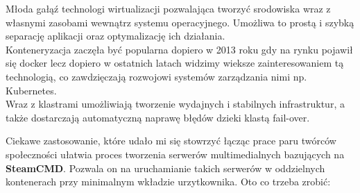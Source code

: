 \documentclass[10pt,a4paper]{report}
\begin{document}
Młoda gałąź technologi wirtualizacji pozwalająca tworzyć srodowiska wraz z własnymi zasobami wewnątrz systemu operacyjnego. Umożliwa to prostą i szybką separację aplikacji oraz optymalizację ich działania.\\

Konteneryzacja zaczęła być popularna dopiero w 2013 roku gdy na rynku pojawił się docker lecz dopiero w ostatnich latach widzimy wieksze zainteresowaniem tą technologią, co zawdzięczają rozwojowi systemów zarządzania nimi np. Kubernetes.\\

Wraz z klastrami umożliwiają tworzenie wydajnych i stabilnych infrastruktur, a także dostarczają automatyczną naprawę błędów dzieki klastą fail-over.

Ciekawe zastosowanie, które udało mi się stowrzyć łącząc prace paru twórców społeczności ułatwia proces tworzenia serwerów multimedialnych bazujących na \textbf{SteamCMD}. Pozwala on na uruchamianie takich serwerów w oddzielnych kontenerach przy minimalnym wkładzie urzytkownika. Oto co trzeba zrobić:
\end{document}
